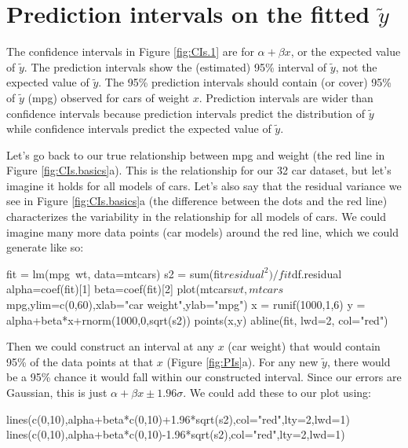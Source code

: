 \section{Prediction intervals on the fitted $\tilde{y}$}

The confidence intervals in Figure \ref{fig:CIs.1} are for $\alpha + \beta x$, or the expected value of $\tilde{y}$.  The prediction intervals show the (estimated) 95\% interval of $\tilde{y}$, not the expected value of $\tilde{y}$.  The 95\% prediction intervals should contain (or cover) 95\% of $\tilde{y}$ (mpg) observed for cars of weight $x$. Prediction intervals are wider than confidence intervals because prediction intervals predict the distribution of $\tilde{y}$ while confidence intervals predict the expected value of $\tilde{y}$.

Let's go back to our true relationship between mpg and weight (the red line in Figure \ref{fig:CIs.basics}a). This is the relationship for our 32 car dataset, but let's imagine it holds for all models of cars. Let's also say that the residual variance we see in Figure \ref{fig:CIs.basics}a (the difference between the dots and the red line) characterizes the variability in the relationship for all models of cars.  We could imagine many more data points (car models) around the red line, which we could generate like so:
\begin{Schunk}
\begin{Sinput}
 fit = lm(mpg~wt, data=mtcars)
 s2 = sum(fit$residual^2)/fit$df.residual
 alpha=coef(fit)[1]
 beta=coef(fit)[2]
 plot(mtcars$wt,mtcars$mpg,ylim=c(0,60),xlab="car weight",ylab="mpg")
 x = runif(1000,1,6)
 y = alpha+beta*x+rnorm(1000,0,sqrt(s2))
 points(x,y)
 abline(fit, lwd=2, col="red")
\end{Sinput}
\end{Schunk}

Then we could construct an interval at any $x$ (car weight) that would contain 95\% of the data points at that  $x$ (Figure \ref{fig:PIs}a).  For any new $\tilde{y}$, there would be a 95\% chance it would fall within our constructed interval.  Since our errors are Gaussian, this is just $\alpha+\beta x \pm 1.96\sigma$.  We could add these to our plot using:
\begin{Schunk}
\begin{Sinput}
 lines(c(0,10),alpha+beta*c(0,10)+1.96*sqrt(s2),col="red",lty=2,lwd=1)
 lines(c(0,10),alpha+beta*c(0,10)-1.96*sqrt(s2),col="red",lty=2,lwd=1)
\end{Sinput}
\end{Schunk}

